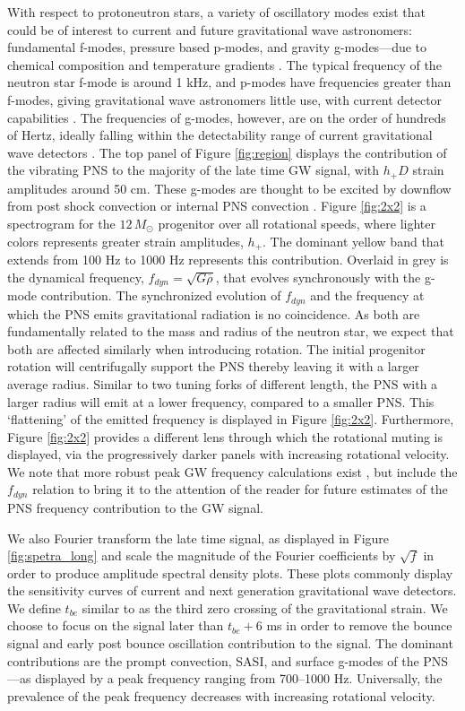 \documentclass[twocolumn,times]{aastex62}  %
\begin{document}
 
With respect to protoneutron stars, a variety of oscillatory modes exist that could be of interest to current and future gravitational wave astronomers: fundamental f-modes, pressure based p-modes, and gravity g-modes---due to chemical composition and temperature gradients \citep{unno:1989}.  The typical frequency of the neutron star f-mode is around 1 kHz, and p-modes have frequencies greater than f-modes, giving gravitational wave astronomers little use, with current detector capabilities \citep{ho:2018}.  The frequencies of g-modes, however, are on the order of hundreds of Hertz, ideally falling within the detectability range of current gravitational wave detectors \citep{martynov:2016}.  The top panel of Figure \ref{fig:region} displays the contribution of the vibrating PNS to the majority of the late time GW signal, with $h_+D$ strain amplitudes around 50 cm.  These g-modes are thought to be excited by downflow from post shock convection or internal PNS convection \citep{murphy:2009,marek:2009b,muller:2013}.  Figure \ref{fig:2x2} is a spectrogram for the $12 \, M_\odot$ progenitor over all rotational speeds, where lighter colors represents greater strain amplitudes, $h_+$.  The dominant yellow band that extends from 100 Hz to 1000 Hz represents this contribution.  Overlaid in grey is the dynamical frequency, $f_{dyn} = \sqrt{G \overline{\rho}}$, that evolves synchronously with the g-mode contribution.  The synchronized evolution of $f_{dyn}$ and the frequency at which the PNS emits gravitational radiation is no coincidence.  As both are fundamentally related to the mass and radius of the neutron star, we expect that both are affected similarly when introducing rotation.  The initial progenitor rotation will centrifugally support the PNS thereby leaving it with a larger average radius.  Similar to two tuning forks of different length, the PNS with a larger radius will emit at a lower frequency, compared to a smaller PNS.  This `flattening' of the emitted frequency is displayed in Figure \ref{fig:2x2}.  Furthermore, Figure \ref{fig:2x2} provides a different lens through which the rotational muting is displayed, via the progressively darker panels with increasing rotational velocity.  We note that more robust peak GW frequency calculations exist \citep[eg.][]{muller:2013}, but include the $f_{dyn}$ relation to bring it to the attention of the reader for future estimates of the PNS frequency contribution to the GW signal.

We also Fourier transform the late time signal, as displayed in Figure \ref{fig:spetra_long} and scale the magnitude of the Fourier coefficients by $\sqrt{f}$ in order to produce amplitude spectral density plots.  These plots commonly display the sensitivity curves of current and next generation gravitational wave detectors.  We define $t_{be}$ similar to \citet{richers:2017} as the third zero crossing of the gravitational strain.  We choose to focus on the signal later than $t_{be} + 6$ ms in order to remove the bounce signal and early post bounce oscillation contribution to the signal.  The dominant contributions are the prompt convection, SASI, and surface g-modes of the PNS---as displayed by a peak frequency ranging from 700--1000 Hz.  Universally, the prevalence of the peak frequency decreases with increasing rotational velocity.  
\end{document}
